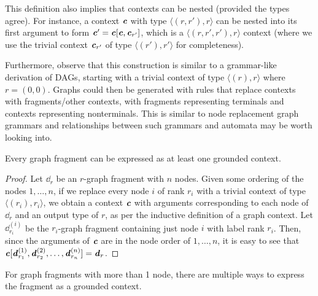 \documentclass[11pt]{article}
\begin{document}
This definition also implies that contexts can be nested (provided the types
agree). For instance, a context $\boldsymbol{\mathit{c}}$ with type $\langle (r, r'), r\rangle$ can
be nested into its first argument to form $\boldsymbol{\mathit{c}}' = \boldsymbol{\mathit{c}}[\boldsymbol{\mathit{c}}, \boldsymbol{\mathit{c}}_{r'}]$, which is
a $\langle (r,r',r'), r \rangle$ context (where we use the trivial context
$\boldsymbol{\mathit{c}}_{r'}$ of type $\langle (r'), r' \rangle$ for completeness). 

Furthermore, observe that this construction is similar to a grammar-like
derivation of DAGs, starting with a trivial context of type $\langle (r), r
\rangle$ where $r = (0,0)$. Graphs could then be generated with rules that
replace contexts with fragments/other contexts, with fragments representing
terminals and contexts representing nonterminals. This is similar to node
replacement graph grammars and relationships between such grammars and automata
may be worth looking into.

\begin{lemma}\label{lem:onegroundedcontext} Every graph fragment can be
  expressed as at least one grounded context.
\end{lemma}

\begin{proof}
  Let $\dd_r$ be an $r$-graph fragment with $n$ nodes. Given some ordering of
  the nodes $1,\ldots,n$, if we replace every node $i$ of rank $r_i$ with a
  trivial context of type $\langle (r_i),r_i \rangle$, we obtain a context $\boldsymbol{\mathit{c}}$
  with arguments corresponding to each node of $\dd_r$ and an output type of
  $r$, as per the inductive definition of a graph context. Let $\dd^{(i)}_{r_i}$
  be the $r_i$-graph fragment containing just node $i$ with label rank $r_i$.
  Then, since the arguments of $\boldsymbol{\mathit{c}}$ are in the node order of $1,\ldots,n$, it
  is easy to see that $\boldsymbol{\mathit{c}}[\boldsymbol{\mathit{d}}^{(1)}_{r_1}, \boldsymbol{\mathit{d}}^{(2)}_{r_2},\ldots,
  \boldsymbol{\mathit{d}}^{(n)}_{r_n}] = \boldsymbol{\mathit{d}}_r$.
\end{proof}

For graph fragments with more than 1 node, there are multiple ways to express
the fragment as a grounded context.
\end{document}
